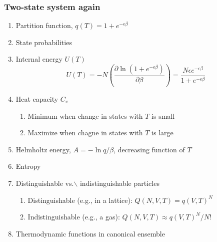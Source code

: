 \documentclass[11pt]{article}
\begin{document}
\subsubsection{Two-state system again}
\label{sec:orgbfa68a0}
\begin{enumerate}
\item Partition function, \(q(T)=1+e^{-\epsilon\beta}\)
\item State probabilities
\item Internal energy \(U(T)\)
\begin{equation}
  U(T)=-N \left ( \frac{\partial \ln(1+e^{-\epsilon\beta})}{\partial\beta}
  \right)=\frac{N\epsilon e^{-\epsilon\beta}}{1+e^{-\epsilon\beta}}
\end{equation}
\item Heat capacity \(C_v\)
\begin{enumerate}
\item Minimum when change in states with \(T\) is small
\item Maximize when chagne in states with \(T\) is large
\end{enumerate}
\item Helmholtz energy, \(A= -\ln q/\beta\), decreasing function of \(T\)
\item Entropy
\item Distinguishable vs.$\backslash$ indistinguishable particles
\begin{enumerate}
\item Distinguishable (e.g., in a lattice): \(Q(N,V,T) = q(V,T)^N\)
\item Indistinguishable (e.g., a gas): \(Q(N,V,T)\approx q(V,T)^N/N!\)
\end{enumerate}
\item Thermodynamic functions in canonical ensemble
\end{enumerate}
\end{document}
